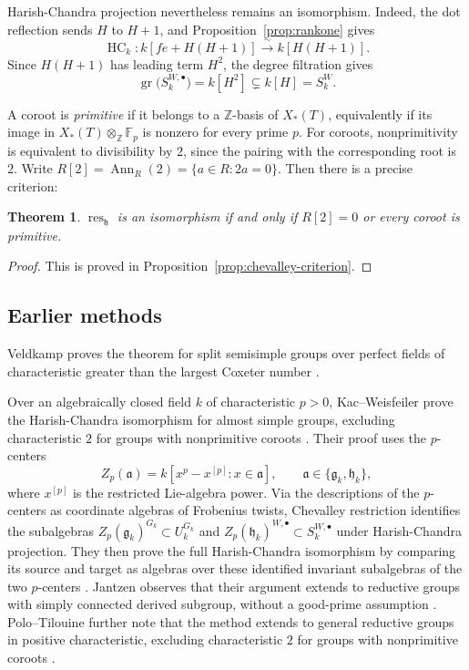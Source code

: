 \documentclass[twoside,a4paper,12pt,reqno]{amsart}
\newtheorem{theorem}{Theorem}[section]
\theoremstyle{remark}
\numberwithin{equation}{section}
\newcommand{\Z}{\mathbb Z}
\newcommand{\F}{\mathbb F}
\newcommand{\fg}{\mathfrak g}
\newcommand{\fh}{\mathfrak h}
\DeclareMathOperator{\HC}{HC}
\DeclareMathOperator{\gr}{gr}
\DeclareMathOperator{\Ann}{Ann}
\newcommand{\iso}{\xrightarrow{\ \sim\ }}
\begin{document}
Harish-Chandra projection nevertheless remains an isomorphism.
Indeed, the dot reflection sends \(H\) to \(H+1\), and
Proposition~\ref{prop:rankone} gives
\[
\HC_k:k[fe+H(H+1)]\iso k[H(H+1)].
\] 
Since \(H(H+1)\) has leading term \(H^2\), the degree filtration gives
\[
\gr\bigl(S_k^{W,\bullet}\bigr)=k[H^2]\subsetneq k[H]=S_k^W.
\]

A coroot is \emph{primitive} if it belongs to a \(\Z\)-basis of
\(X_*(T)\), equivalently if its image in
\(X_*(T)\otimes_\Z\F_p\) is nonzero for every prime \(p\).
For coroots, nonprimitivity is equivalent to divisibility by \(2\),
since the pairing with the corresponding root is \(2\).
Write \(R[2]=\Ann_R(2)=\{a\in R:2a=0\}\). Then there is a precise criterion:

\begin{theorem}


    \(
\operatorname{res}_{\fh}\) is an isomorphism if and only if 
\(
R[2]=0\) or every coroot is primitive.
\end{theorem}

\begin{proof}
This is proved in Proposition~\ref{prop:chevalley-criterion}.
\end{proof}


\subsection{Earlier methods}\label{subsec:previous}

Veldkamp proves the theorem for split semisimple groups over
perfect fields of characteristic greater than the largest Coxeter
number \cite[Prop.~2.1 and Thm.~3.1]{Veldkamp}.

Over an algebraically closed field \(k\) of characteristic \(p>0\),
Kac--Weisfeiler prove the Harish-Chandra isomorphism for almost simple
groups, excluding characteristic \(2\) for groups with nonprimitive
coroots \cite[Thm.~1 bis]{KW}. Their proof uses the \(p\)-centers
\[
Z_p(\mathfrak a)=k[x^p-x^{[p]}:x\in\mathfrak a],
\qquad \mathfrak a\in\{\fg_k,\fh_k\},
\]
where \(x^{[p]}\) is the restricted Lie-algebra power.
Via the descriptions of the \(p\)-centers as coordinate algebras of
Frobenius twists, Chevalley restriction identifies the subalgebras
\(Z_p(\fg_k)^{G_k}\subset U_k^{G_k}\) and
\(Z_p(\fh_k)^{W,\bullet}\subset S_k^{W,\bullet}\)
under Harish-Chandra projection. They then prove the full
Harish-Chandra isomorphism by comparing its source and target as
algebras over these identified invariant subalgebras of the two \(p\)-centers
\cite[Thm.~4(i), \S\S4.1--4.6, 5.3--5.4 and 8.1]{KW}.
Jantzen observes that their argument extends to reductive groups
with simply connected derived subgroup, without a good-prime
assumption \cite[\S9.3, Remark]{Jantzen}.
Polo--Tilouine further note that the method extends to general
reductive groups in positive characteristic, excluding characteristic
\(2\) for groups with nonprimitive coroots
\cite[\S2.6.2, Remark]{PT}.
\end{document}

